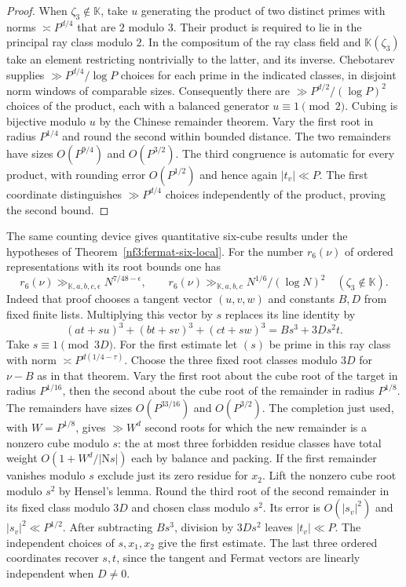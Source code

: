 \documentclass[11pt,letterpaper]{article}
\theoremstyle{definition}
\numberwithin{equation}{section}
\begin{document}
\begin{proof}
When $\zeta_3\notin\mathbb K$, take $u$ generating the product
of two distinct primes with norms $\asymp P^{d/4}$ that are
$2$ modulo $3$. Their product is required to lie in the principal
ray class modulo $2$. In the compositum of the ray class field
and $\mathbb K(\zeta_3)$ take an element restricting nontrivially
to the latter, and its inverse. Chebotarev supplies
$\gg P^{d/4}/\log P$ choices for each prime in the indicated
classes, in disjoint norm windows of comparable sizes.
Consequently there are $\gg P^{d/2}/(\log P)^2$ choices of
the product, each with a balanced generator $u\equiv1\pmod2$.
Cubing is bijective modulo $u$ by the Chinese remainder theorem.
Vary the first root in radius $P^{1/4}$ and round the second
within bounded distance. The two remainders have sizes
$O(P^{9/4})$ and $O(P^{3/2})$. The third congruence is automatic
for every product, with rounding error $O(P^{1/2})$ and hence
again $|t_v|\ll P$. The first coordinate distinguishes
$\gg P^{d/4}$ choices independently of the product, proving
the second bound.
\end{proof}

The same counting device gives quantitative six-cube results
under the hypotheses of Theorem~\ref{nf3:fermat-six-local}.
For the number $r_6(\nu)$ of ordered representations with its root
bounds one has
\[
 r_6(\nu)\gg_{\mathbb K,a,b,c,\epsilon}N^{7/48-\epsilon},
 \qquad
 r_6(\nu)\gg_{\mathbb K,a,b,c}N^{1/6}/(\log N)^2
                 \quad(\zeta_3\notin\mathbb K).
\]
Indeed that proof chooses a tangent vector $(u,v,w)$ and constants
$B,D$ from fixed finite lists. Multiplying this vector by $s$
replaces its line identity by
\[
 (at+su)^3+(bt+sv)^3+(ct+sw)^3=B s^3+3D s^2 t .
\]
Take $s\equiv1\pmod{3D}$. For the first estimate let $(s)$ be
prime in this ray class with norm $\asymp P^{d(1/4-\tau)}$.
Choose the three fixed root classes modulo $3D$ for $\nu-B$
as in that theorem. Vary the first root about the cube root of
the target in radius $P^{1/16}$, then the second about the cube
root of the remainder in radius $P^{1/8}$. The remainders have
sizes $O(P^{33/16})$ and $O(P^{3/2})$. The completion just used,
with $W=P^{1/8}$, gives $\gg W^d$ second roots for which the
new remainder is a nonzero cube modulo $s$: the at most three
forbidden residue classes have total weight $O(1+W^d/|\mathrm Ns|)$
each by balance and packing. If the first remainder vanishes modulo
$s$ exclude just its zero residue for $x_2$. Lift the nonzero cube
root modulo $s^2$ by Hensel's lemma. Round the third root of the
second remainder in its fixed class modulo $3D$ and chosen class
modulo $s^2$. Its error is $O(|s_v|^2)$ and $|s_v|^2\ll P^{1/2}$.
After subtracting $B s^3$, division by $3D s^2$ leaves $|t_v|\ll P$.
The independent choices of $s,x_1,x_2$ give the first estimate.
The last three ordered coordinates recover $s,t$, since the tangent
and Fermat vectors are linearly independent when $D\ne0$.
\end{document}
